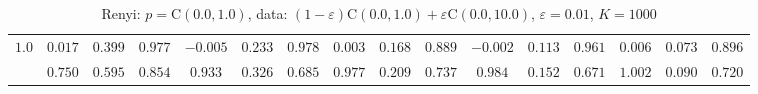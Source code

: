 \begin{table}
\begin{center}
\begin{tabular}{|c|ccc|ccc|ccc|ccc|ccc|}
\hline 
$1.0$ & $ 0.017 $ & $ 0.399 $ & $ 0.977 $ & $ -0.005 $ & $ 0.233 $ & $ 0.978 $ & $ 0.003 $ & $ 0.168 $ & $ 0.889 $ & $ -0.002 $ & $ 0.113 $ & $ 0.961 $ & $ 0.006 $ & $ 0.073 $ & $ 0.896 $\\ 
 & $ 0.750 $ & $ 0.595 $ & $ 0.854 $ & $ 0.933 $ & $ 0.326 $ & $ 0.685 $ & $ 0.977 $ & $ 0.209 $ & $ 0.737 $ & $ 0.984 $ & $ 0.152 $ & $ 0.671 $ & $ 1.002 $ & $ 0.090 $ & $ 0.720 $\\ 
\hline 
\end{tabular}
\caption{Renyi: $p = \mathrm{C}(0.0,1.0)$, data: $(1-\varepsilon)\mathrm{C}(0.0,1.0) + \varepsilon \mathrm{C}(0.0,10.0)$, $\varepsilon =  0.01$, $K = 1000$} 
\end{center}
\end{table}
 
